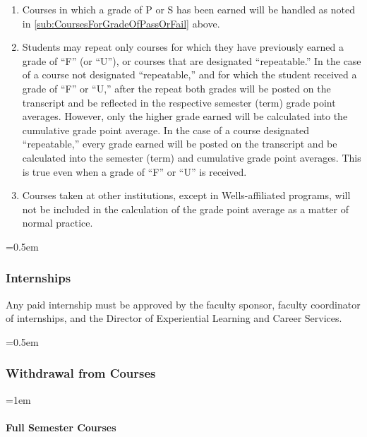 \documentclass{manual}
\newcommand{\modified}[1]{}
\let\oldsubsubsection\subsubsection
\renewcommand\subsubsection{\leftskip=0.5em\oldsubsubsection}
\let\oldparagraph\paragraph
\renewcommand\paragraph{\leftskip=1em\oldparagraph}
\begin{document}
\begin{enumerate}[label=\arabic*]
\item Courses in which a grade of P or S has been earned will be handled as noted in \cref{sub:CoursesForGradeOfPassOrFail} above.

\item Students may repeat only courses for which they have previously earned a grade\modified{4/8/03}  of ``F'' (or ``U''), or courses that are designated ``repeatable.'' In the case of a course not designated ``repeatable,'' and for which the student received a grade of ``F'' or ``U,'' after the repeat both grades will be posted on the transcript and be reflected in the respective semester (term) grade point averages. However, only the higher grade earned will be calculated into the cumulative grade point average. In the case of a course designated ``repeatable,'' every grade earned will be posted on the transcript and be calculated into the semester (term) and cumulative grade point averages. This is true even when a grade of ``F'' or ``U'' is received.

\item Courses taken at other institutions, except in Wells-affiliated programs, will not be included in the calculation of the grade point average as a matter of normal practice.

\end{enumerate}

\subsubsection{Internships}\modified{5/13/93}

Any paid internship must be approved by the faculty sponsor, faculty coordinator of internships, and the Director of Experiential Learning and Career Services.

\subsubsection{Withdrawal from Courses}


\paragraph{Full Semester Courses}
\end{document}
